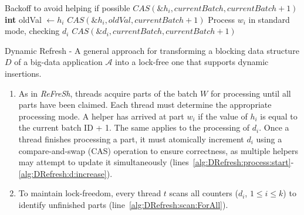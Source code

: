 {\begin{algorithm}[htbp]
\begin{algorithmic}[1]
         \label{alg:DRefresh:scan:ForAll} 
            \State Backoff to avoid helping if possible \label{alg:DRefresh:help:backoff}
             \label{alg:DRefresh:help:if}
                 \label{alg:DRefresh:h:true}
                    \State $\mathit{CAS(\&h_i, currentBatch, currentBatch+1)}$ 
                      \label{alg:DRefresh:h:fallenBehind}
                    \State \textbf{int} oldVal $\gets \mathit{h_i}$
                    \State $\mathit{CAS(\&h_i, oldVal, currentBatch+1)}$
                \EndIf
            \EndIf
            \State Process $\mathit{w_i}$ in standard mode, checking $\mathit{d_i}$
                \State $\mathit{CAS(\&d_i, currentBatch, currentBatch+1)}$ \label{alg:DRefresh:help:d:true}
            \EndIf
        \EndFor
    \EndProcedure
    
    \end{algorithmic}
    
    \caption{Dynamic Refresh - A general approach for transforming a blocking data structure $\mathit{D}$ of a big-data application $\mathcal{A}$ into a lock-free one that supports dynamic insertions.}
    \label{alg:DRefresh}
    \end{algorithm}

    \newpage

    \begin{enumerate}
        \item As in \textit{ReFreSh}, threads acquire parts of the batch $W$ for processing until
        all parts have been claimed. Each thread must determine the appropriate processing mode.
        A helper has arrived at part $w_i$ if the value of $h_i$ is equal to the current batch ID + 1.
        The same applies to the processing of $d_i$. Once a thread finishes processing a part, it must
        atomically increment $d_i$ using a compare-and-swap (CAS) operation to ensure correctness, as
        multiple helpers may attempt to update it simultaneously (lines~\ref{alg:DRefresh:process:start}-
        \ref{alg:DRefresh:d:increase}).  
    
        \item To maintain lock-freedom, every thread $t$ scans all counters  
        ($d_i$, $1 \leq i \leq k$) to identify unfinished parts (line~\ref{alg:DRefresh:scan:ForAll}).  
    

\end{enumerate}}
